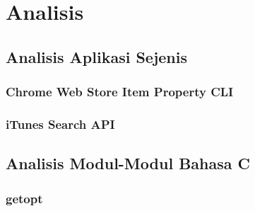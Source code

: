 \chapter{Analisis}
\label{chap:analysis}



\section{Analisis Aplikasi Sejenis}
\label{sec:analysis-similarapps}



\subsection{Chrome Web Store Item Property CLI}
\label{sec:sec-analysis-similarapps-chromewebstore}



\subsection{iTunes Search API}
\label{sec:sec-analysis-similarapps-itunessearch}



\section{Analisis Modul-Modul Bahasa C}
\label{sec:analysis-cmodules}



\subsection{getopt}
\label{sec:analysis-cmodules-getopt}


